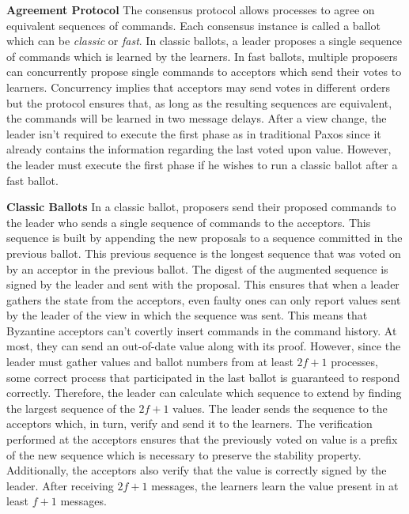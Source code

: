 \textbf{Agreement Protocol} The consensus protocol allows processes to agree on equivalent sequences of commands. Each consensus instance is called a ballot which can be \textit{classic} or \textit{fast}. In classic ballots, a leader proposes a single sequence of commands which is learned by the learners. In fast ballots, multiple proposers can concurrently propose single commands to acceptors which send their votes to learners. Concurrency implies that acceptors may send votes in different orders but the protocol ensures that, as long as the resulting sequences are equivalent, the commands will be learned in two message delays. After a view change, the leader isn't required to execute the first phase as in traditional Paxos since it already contains the information regarding the last voted upon value. However, the leader must execute the first phase if he wishes to run a classic ballot after a fast ballot. \par
\textbf{Classic Ballots} In a classic ballot, proposers send their proposed commands to the leader who sends a single sequence of commands to the acceptors. This sequence is built by appending the new proposals to a sequence committed in the previous ballot. This previous sequence is the longest sequence that was voted on by an acceptor in the previous ballot. The digest of the augmented sequence is signed by the leader and sent with the proposal. This ensures that when a leader gathers the state from the acceptors, even faulty ones can only report values sent by the leader of the view in which the sequence was sent. This means that Byzantine acceptors can't covertly insert commands in the command history. At most, they can send an out-of-date value along with its proof. However, since the leader must gather values and ballot numbers from at least $2f+1$ processes, some correct process that participated in the last ballot is guaranteed to respond correctly. Therefore, the leader can calculate which sequence to extend by finding the largest sequence of the $2f+1$ values. The leader sends the sequence to the acceptors which, in turn, verify and send it to the learners. The verification performed at the acceptors ensures that the previously voted on value is a prefix of the new sequence which is necessary to preserve the stability property. Additionally, the acceptors also verify that the value is correctly signed by the leader. After receiving $2f+1$ messages, the learners learn the value present in at least $f+1$ messages. \par
